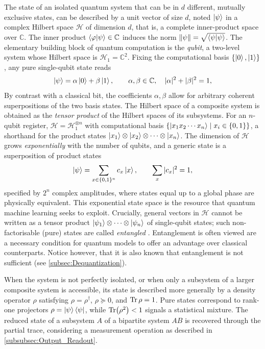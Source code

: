 \documentclass[aps,10pt,groupedaddress,prx,superscriptaddress,twocolumn,balancelastpage, tightenlines]{revtex4-2}
\theoremstyle{plain}  %
\begin{document}
The state of an isolated quantum system that can be in $d$ different, mutually exclusive states, can be described by a unit vector of size $d$, noted $\ket{\psi}$ in a complex Hilbert space $\mathcal{H}$ of dimension $d$, that is, a complete inner-product space over $\mathbb{C}$. The inner product $\braket{\varphi}{\psi} \in \mathbb{C}$ induces the norm $\lVert \psi \rVert = \sqrt{\braket{\psi}{\psi}}$. The elementary building block of quantum computation is the \emph{qubit}, a two-level system whose Hilbert space is $\mathcal{H}_1 = \mathbb{C}^2$. Fixing the computational basis $\{\ket{0},\ket{1}\}$, any pure single-qubit state reads
\begin{equation}
    \ket{\psi} = \alpha \ket{0} + \beta \ket{1}, \qquad \alpha,\beta \in \mathbb{C}, \quad |\alpha|^2 + |\beta|^2 = 1,
    \label{eq:single-qubit}
\end{equation}
By contrast with a classical bit, the coefficients $\alpha,\beta$ allow for arbitrary coherent superpositions of the two basis states. The Hilbert space of a composite system is obtained as the \emph{tensor product} of the Hilbert spaces of its subsystems. For an $n$-qubit register, $\mathcal{H} = \mathcal{H}_1^{\otimes n}$ with computational basis $\{\ket{x_1 x_2 \cdots x_n} \mid x_i \in \{0,1\}\}$, a shorthand for the product states $\ket{x_1}\otimes\ket{x_2}\otimes \cdots \otimes\ket{x_n}$. The dimension of $\mathcal{H}$ grows \emph{exponentially} with the number of qubits, and a generic state is a superposition of product states
\begin{equation}\label{eq: state psi}
    \ket{\psi} = \sum_{x \in \{0,1\}^n} c_x \ket{x}, \qquad \sum_x |c_x|^2 = 1,
\end{equation}
specified by $2^n$ complex amplitudes, where states equal up to a global phase are physically equivalent. This exponential state space is the resource that quantum machine learning seeks to exploit. Crucially, general vectors in $\mathcal{H}$ cannot be written as a tensor product $\ket{\psi_1}\otimes\cdots\otimes\ket{\psi_n}$ of single-qubit states; such non-factorisable (pure) states are called \emph{entangled} \cite{dewolf2023quantumcomputinglecturenotes,horodecki2009quantum}.  Entanglement is often viewed are a necessary condition for quantum models to offer an advantage over classical counterparts. Notice however, that it is also known that entanglement is not sufficient (see \autoref{subsec:Dequantization}).

When the system is not perfectly isolated, or when only a subsystem of a larger composite system is accessible, its state is described more generally by a density operator $\rho$ satisfying $\rho = \rho^{\dagger}$, $\rho \succeq 0$, and $\Tr \rho = 1$. Pure states correspond to rank-one projectors $\rho = \ket{\psi}\bra{\psi}$, while $\Tr(\rho^2) < 1$ signals a statistical mixture. The reduced state of a subsystem $A$ of a bipartite system $AB$ is recovered through the partial trace, considering a measurement operation as described in \autoref{subsubsec:Output_Readout}.
\end{document}
